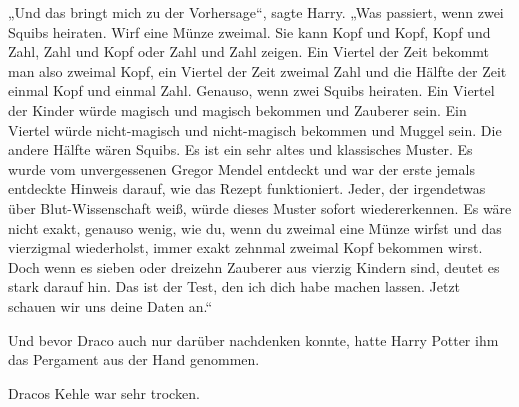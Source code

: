 „Und das bringt mich zu der Vorhersage“, sagte Harry.
„Was passiert, wenn zwei Squibs heiraten. Wirf eine Münze zweimal. Sie kann Kopf und Kopf, Kopf und Zahl, Zahl und Kopf oder Zahl und Zahl zeigen. Ein Viertel der Zeit bekommt man also zweimal Kopf, ein Viertel der Zeit zweimal Zahl und die Hälfte der Zeit einmal Kopf und einmal Zahl. Genauso, wenn zwei Squibs heiraten. Ein Viertel der Kinder würde magisch und magisch bekommen und Zauberer sein. Ein Viertel würde nicht-magisch und nicht-magisch bekommen und Muggel sein. Die andere Hälfte wären Squibs. Es ist ein sehr altes und klassisches Muster. Es wurde vom unvergessenen Gregor Mendel entdeckt und war der erste jemals entdeckte Hinweis darauf, wie das Rezept funktioniert. Jeder, der irgendetwas über Blut-Wissenschaft weiß, würde dieses Muster sofort wiedererkennen. Es wäre nicht exakt, genauso wenig, wie du, wenn du zweimal eine Münze wirfst und das vierzigmal wiederholst, immer exakt zehnmal zweimal Kopf bekommen wirst. Doch wenn es sieben oder dreizehn Zauberer aus vierzig Kindern sind, deutet es stark darauf hin. Das ist der Test, den ich dich habe machen lassen. Jetzt schauen wir uns deine Daten an.“

Und bevor Draco auch nur darüber nachdenken konnte, hatte Harry Potter ihm das Pergament aus der Hand genommen.

Dracos Kehle war sehr trocken.


